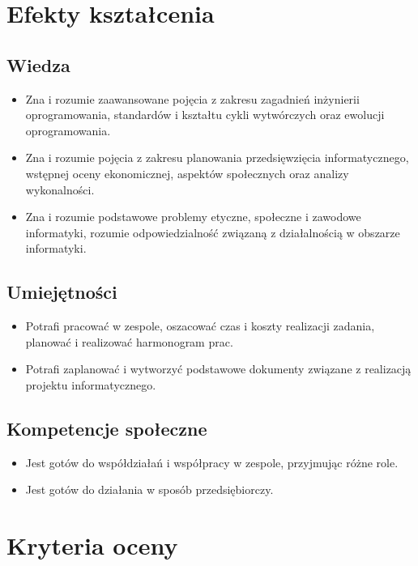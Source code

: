 \documentclass[12pt, a4paper]{article}
\begin{document}
\section{Efekty kształcenia}

\subsection*{Wiedza}
\begin{itemize}
  \item Zna i rozumie zaawansowane pojęcia z zakresu zagadnień inżynierii oprogramowania, standardów i kształtu cykli wytwórczych oraz ewolucji oprogramowania.
  \item Zna i rozumie pojęcia z zakresu planowania przedsięwzięcia informatycznego, wstępnej oceny ekonomicznej, aspektów społecznych oraz analizy wykonalności.
  \item Zna i rozumie podstawowe problemy etyczne, społeczne i zawodowe informatyki, rozumie odpowiedzialność związaną z działalnością w obszarze informatyki.
\end{itemize}

\subsection*{Umiejętności}
\begin{itemize}
  \item Potrafi pracować w zespole, oszacować czas i koszty realizacji zadania, planować i realizować harmonogram prac.
  \item Potrafi zaplanować i wytworzyć podstawowe dokumenty związane z realizacją projektu informatycznego.
\end{itemize}

\subsection*{Kompetencje społeczne}
\begin{itemize}
  \item Jest gotów do współdziałań i współpracy w zespole, przyjmując różne role.
  \item Jest gotów do działania w sposób przedsiębiorczy.
\end{itemize}

\section{Kryteria oceny}
\end{document}
